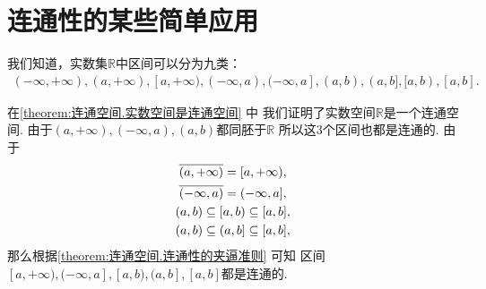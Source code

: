 \section{连通性的某些简单应用}
我们知道，实数集\(\mathbb{R}\)中区间可以分为九类：\begin{gather*}
	(-\infty,+\infty),
	(a,+\infty),
	[a,+\infty),
	(-\infty,a),
	(-\infty,a],
	(a,b),
	(a,b],
	[a,b),
	[a,b].
\end{gather*}

在\cref{theorem:连通空间.实数空间是连通空间} 中
我们证明了实数空间\(\mathbb{R}\)是一个连通空间.
由于\((a,+\infty),(-\infty,a),(a,b)\)都同胚于\(\mathbb{R}\)
所以这3个区间也都是连通的.
由于\begin{gather*}
	\overline{(a,+\infty)}
	= [a,+\infty), \\
	\overline{(-\infty,a)}
	= (-\infty,a], \\
	(a,b) \subseteq [a,b) \subseteq [a,b], \\
	(a,b) \subseteq (a,b] \subseteq [a,b],
\end{gather*}
那么根据\cref{theorem:连通空间.连通性的夹逼准则} 可知
区间\([a,+\infty),(-\infty,a],[a,b),(a,b],[a,b]\)都是连通的.
